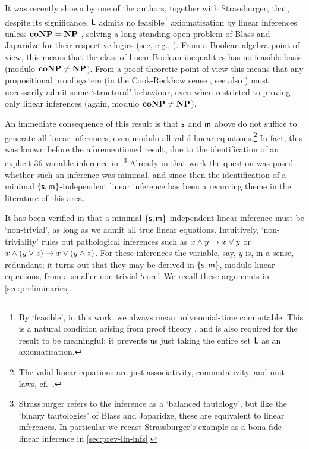 \documentclass[a4paper, UKenglish, cleveref]{lipics-v2019}
\begin{document}
It was recently shown by one of the authors, together with Strassburger, that, despite its significance, $\mathsf L$ admits no feasible\footnote{By `feasible', in this work, we always mean polynomial-time computable. This is a natural condition arising from proof theory \cite{CooRec74:length-of-proofs,CooRec79:rel-eff-pps}, and is also required for the result to be meaningful: it prevents us just taking the entire set $\mathsf L$ as an axiomatisation.} axiomatisation by linear inferences unless $\mathbf{co}\mathbf{NP} = \mathbf{NP}$ \cite{DasStr15:no-comp-lin-sys,DasStr16:no-compl-lin-sys}, solving a long-standing open problem of Blass and Japaridze for their respective logics (see, e.g., \cite{Jap17:elem-base-cirq-calc}).
From a Boolean algebra point of view, this means that the class of linear Boolean inequalities has no feasible basis (modulo $\mathbf{co}\mathbf{NP} \neq \mathbf{NP}$).
From a proof theoretic point of view this means that any propositional proof system (in the Cook-Reckhow sense \cite{CooRec74:length-of-proofs,CooRec79:rel-eff-pps}, see also \cite{Kra19:cook-reckhow}) must necessarily admit some `structural' behaviour, even when restricted to proving only linear inferences (again, modulo $\mathbf{co}\mathbf{NP}\neq \mathbf{NP}$).

An immediate consequence of this result is that $\mathsf{s}$ and $\mathsf{m}$ above do not suffice to generate all linear inferences, even modulo all valid linear equations.\footnote{The valid linear equations are just associativity, commutativity, and unit laws, cf.~\cite{DasStr15:no-comp-lin-sys,DasStr16:no-compl-lin-sys}.}
In fact, this was known before the aforementioned result, due to the identification of an explicit 36 variable inference in \cite{Str12:ext-wo-cut}.\footnote{Strassburger refers to the inference as a `balanced tautology', but like the `binary tautologies' of Blass and Japaridze, these are equivalent to linear inferences. In particular we recast Strassburger's example as a bona fide linear inference in \cref{sec:prev-lin-infs}.}
Already in that work the question was posed whether such an inference was minimal, and since then the identification of a minimal $\{\mathsf{s},\mathsf{m} \}$-independent linear inference has been a recurring theme in the literature of this area.

It has been verified in \cite{Das13:lin-inf-rew} that a minimal $\{\mathsf{s},\mathsf{m} \}$-independent linear inference must be `non-trivial', as long as we admit all true linear equations.
Intuitively, `non-triviality' rules out pathological inferences such as $x \land y \rightarrow x \lor y$ or $x \land (y \lor z) \rightarrow x \lor (y \land z)$. For these inferences the variable, say, $y$ is, in a sense, redundant; it turns out that they may be derived in $\{\mathsf{s},\mathsf{m}\}$, modulo linear equations, from a smaller non-trivial `core'.
We recall these arguments in \cref{sec:preliminaries}.
\end{document}
